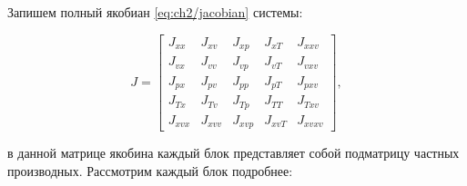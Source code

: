 Запишем полный якобиан \ref{eq:ch2/jacobian} системы:

\begin{equation*}
    J = \begin{bmatrix}
        J_{xx}  & J_{xv}  & J_{xp}  & J_{xT}  & J_{xxv}  \\
        J_{vx}  & J_{vv}  & J_{vp}  & J_{vT}  & J_{vxv}  \\
        J_{px}  & J_{pv}  & J_{pp}  & J_{pT}  & J_{pxv}  \\
        J_{Tx}  & J_{Tv}  & J_{Tp}  & J_{TT}  & J_{Txv}  \\
        J_{xvx} & J_{xvv} & J_{xvp} & J_{xvT} & J_{xvxv}
    \end{bmatrix},
\end{equation*}

в данной матрице якобина каждый блок представляет собой подматрицу частных производных.
Рассмотрим каждый блок подробнее:

